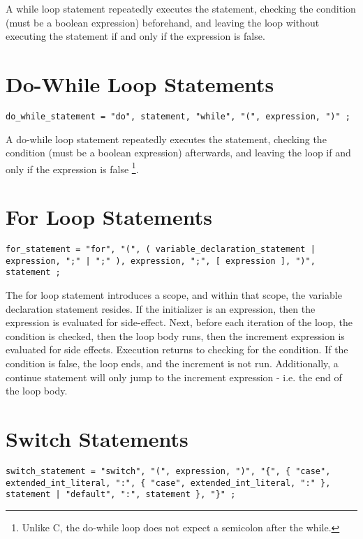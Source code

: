\documentclass[letterpaper,12pt]{book}
\begin{document}
A while loop statement repeatedly executes the statement, checking the condition (must be a boolean expression) beforehand, and leaving the loop without executing the statement if and only if the expression is false.

\section{Do-While Loop Statements}

\begin{lstlisting}[breaklines=true]
do_while_statement = "do", statement, "while", "(", expression, ")" ;
\end{lstlisting}

A do-while loop statement repeatedly executes the statement, checking the condition (must be a boolean expression) afterwards, and leaving the loop if and only if the expression is false
\footnote{Unlike C, the do-while loop does not expect a semicolon after the while.}.

\section{For Loop Statements}

\begin{lstlisting}[breaklines=true]
for_statement = "for", "(", ( variable_declaration_statement | expression, ";" | ";" ), expression, ";", [ expression ], ")", statement ;
\end{lstlisting}

The for loop statement introduces a scope, and within that scope, the variable declaration statement resides. If the initializer is an expression, then the expression is evaluated for side-effect. Next, before each iteration of the loop, the condition is checked, then the loop body runs, then the increment expression is evaluated for side effects. Execution returns to checking for the condition. If the condition is false, the loop ends, and the increment is not run. Additionally, a continue statement will only jump to the increment expression - i.e. the end of the loop body.

\section{Switch Statements}

\begin{lstlisting}[breaklines=true]
switch_statement = "switch", "(", expression, ")", "{", { "case", extended_int_literal, ":", { "case", extended_int_literal, ":" }, statement | "default", ":", statement }, "}" ;
\end{lstlisting}
\end{document}
